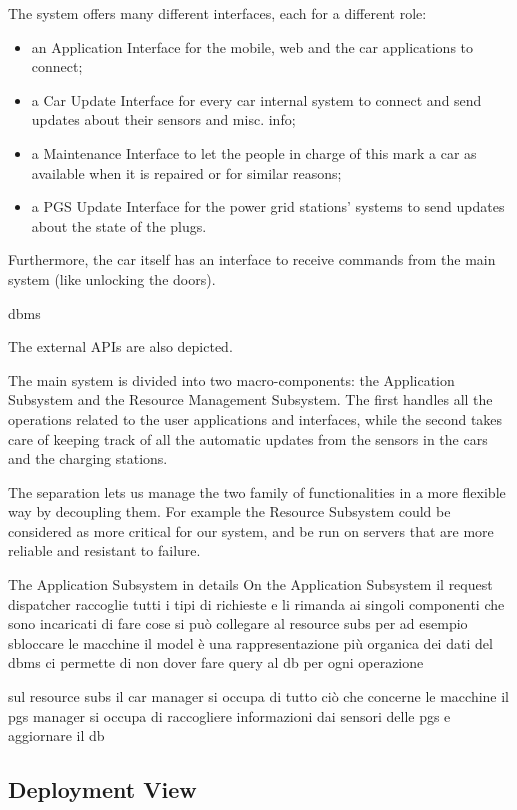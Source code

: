 \documentclass[english]{article}
\begin{document}
The system offers many different interfaces, each for a different role:
\begin{itemize}
	\item{an Application Interface for the mobile, web and the car applications to connect;}
	\item{a Car Update Interface for every car internal system to connect and send updates about their sensors and misc. info;}
	\item{a Maintenance Interface to let the people in charge of this mark a car as available when it is repaired or for similar reasons;}
	\item{a PGS Update Interface for the power grid stations' systems to send updates about the state of the plugs.}
\end{itemize}

Furthermore, the car itself has an interface to receive commands from the main system (like unlocking the doors).

dbms

The external APIs are also depicted.


The main system is divided into two macro-components: the Application Subsystem and the Resource Management Subsystem.
The first handles all the operations related to the user applications and interfaces, while the second takes care of keeping track of all the automatic updates from the sensors in the cars and the charging stations.

The separation lets us manage the two family of functionalities in a more flexible way by decoupling them. For example the Resource Subsystem could be considered as more critical for our system, and be run on servers that are more reliable and resistant to failure.

The Application Subsystem in details
On the Application Subsystem 
il request dispatcher raccoglie tutti i tipi di richieste e li rimanda ai singoli componenti che sono incaricati di fare cose
si può collegare al resource subs per ad esempio sbloccare le macchine
il model è una rappresentazione più organica dei dati del dbms 
ci permette di non dover fare query al db per ogni operazione

sul resource subs il car manager si occupa di tutto ciò che concerne le macchine
il pgs manager si occupa di raccogliere informazioni dai sensori delle pgs e aggiornare il db

\newpage
\subsection{Deployment View}
\end{document}
